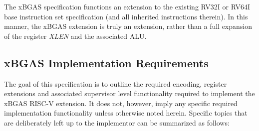\documentclass{article}
\begin{document}
The xBGAS specification functions an extension to the existing RV32I or RV64I~\cite{RVSpec} 
base instruction set specification (and all inherited instructions therein).  In this 
manner, the xBGAS extension is truly an extension, rather than a full expansion 
of the register \textit{XLEN} and the associated ALU.

\subsection{xBGAS Implementation Requirements}

The goal of this specification is to outline the required encoding, register extensions 
and associated supervisor level functionality required to implement the xBGAS 
RISC-V extension.  It does not, however, imply any specific required implementation 
functionality unless otherwise noted herein.  Specific topics that are deliberately 
left up to the implementor can be summarized as follows:
\end{document}
